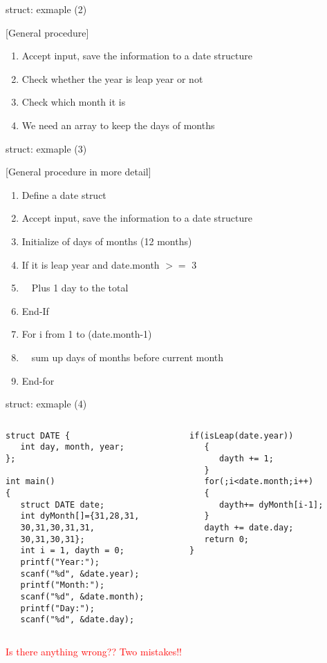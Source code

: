 \begin{frame}[fragile]{struct: exmaple (2)}

[General procedure]
\begin{enumerate}
	\item {Accept input, save the information to a date structure}
	\item {Check whether the year is leap year or not}
	\item {Check which month it is}
	\item {We need an array to keep the days of months}
\end{enumerate}

\end{frame}

\begin{frame}[fragile]{struct: exmaple (3)}

[General procedure in more detail]
\begin{enumerate}
	\item {Define a date struct}
	\item {Accept input, save the information to a date structure}
	\item {Initialize of days of months (12 months)}
	\item {If it is leap year and date.month $>=$ 3}
	\item {~~Plus 1 day to the total}
	\item {End-If}
	\item {For i from 1 to (date.month-1)}
	\item {~~sum up days of months before current month}
	\item {End-for}
\end{enumerate}

\end{frame}

\begin{frame}[fragile]{struct: exmaple (4)}
\vspace{-0.22in}
\begin{columns}
\begin{column}{0.48\linewidth}
\begin{lstlisting}
struct DATE {
   int day, month, year;
};

int main()
{
   struct DATE date;
   int dyMonth[]={31,28,31,
   30,31,30,31,31,
   30,31,30,31};
   int i = 1, dayth = 0;
   printf("Year:");
   scanf("%d", &date.year);
   printf("Month:");
   scanf("%d", &date.month);
   printf("Day:");
   scanf("%d", &date.day);
\end{lstlisting}
\end{column}
\begin{column}{0.48\linewidth}
\begin{lstlisting}[firstnumber=17]
   if(isLeap(date.year))
   {
      dayth += 1;
   }
   for(;i<date.month;i++)
   {
      dayth+= dyMonth[i-1];
   }
   dayth += date.day;
   return 0;
}
\end{lstlisting}
\end{column}
\end{columns}
\vspace{-0.15in}
\textcolor{red}{Is there anything wrong?? Two mistakes!!}
\end{frame}

